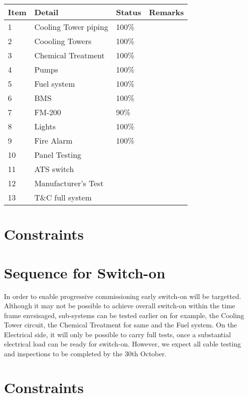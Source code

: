 \begin{tabular}{llll}
\toprule
Item & Detail & Status & Remarks\\
\midrule
1    & Cooling Tower piping & 100\% &\\
2    & Coooling Towers      & 100\% &\\
3    & Chemical Treatment   & 100\% &\\
4    & Pumps                & 100\% &\\
5    & Fuel system          & 100\% &\\
\midrule
6    & BMS                  & 100\% &\\
7    & FM-200               &  90\% &\\
8    & Lights               & 100\% &\\
9    & Fire Alarm           & 100\% &\\
\midrule
10   & Panel Testing        &       &\\
11   & ATS switch           &       &\\
\midrule
12   & Manufacturer's Test  &       &\\
13   & T\&C full system     &       &\\
\bottomrule

\end{tabular}



\section{Constraints}



\section{Sequence for Switch-on}
\normalsize
In order to enable progressive commissioning early switch-on will be targetted. Although it may not be possible to achieve overall switch-on within the time frame envsisaged, sub-systems can be tested earlier on for example, the Cooling Tower circuit, the Chemical Treatment for same and the Fuel system. On the Electrical side, it will only be possible to carry full tests, once a substantial electrical load can be ready for switch-on. However, we expect all cable testing and inspections to be completed by the 30th October.

\section{Constraints}
